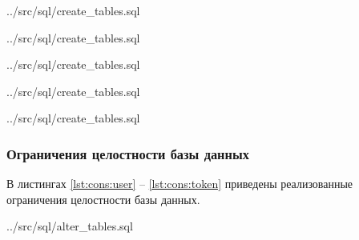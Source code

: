 \begin{code}
    \begin{lstinputlisting}[
            caption={Создание StructAnnotation},
            firstline=51,
            lastline=59,
        ]{../src/sql/create_tables.sql}
    \end{lstinputlisting}
\end{code}

\begin{code}
    \begin{lstinputlisting}[
            caption={Создание TermAnnotation},
            firstline=62,
            lastline=69,
        ]{../src/sql/create_tables.sql}
    \end{lstinputlisting}
\end{code}

\begin{code}
    \begin{lstinputlisting}[
            caption={Создание TermAnnotationPart},
            firstline=72,
            lastline=81,
        ]{../src/sql/create_tables.sql}
    \end{lstinputlisting}
\end{code}

\begin{code}
    \begin{lstinputlisting}[
            caption={Создание Sentence},
            firstline=84,
            lastline=88,
        ]{../src/sql/create_tables.sql}
    \end{lstinputlisting}
\end{code}

\begin{code}
    \begin{lstinputlisting}[
            label={lst:table:token},
            caption={Создание Token},
            firstline=91,
            lastline=96,
        ]{../src/sql/create_tables.sql}
    \end{lstinputlisting}
\end{code}

\subsubsection{Ограничения целостности базы данных}

В листингах \ref{lst:cons:user} -- \ref{lst:cons:token} приведены реализованные ограничения целостности базы данных.

\begin{code}
    \begin{lstinputlisting}[
            label={lst:cons:user},
            caption={Ограничения User},
            firstline=1,
            lastline=13,
        ]{../src/sql/alter_tables.sql}
    \end{lstinputlisting}
\end{code}


